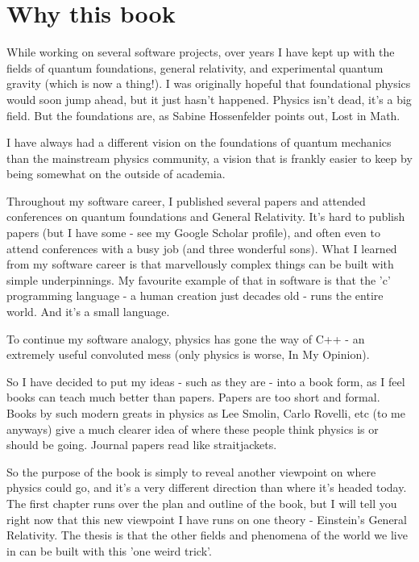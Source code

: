 \documentclass[../rzero]{subfiles}
\begin{document}
\section*{Why this book}
While working on several software projects, over years I have kept up with the fields of quantum foundations, general relativity, and experimental quantum gravity (which is now a thing!)\cite{Marletto2017}. I was originally hopeful that foundational physics would soon jump ahead, but it just hasn't happened. Physics isn't dead, it's a big field. But the foundations are, as Sabine Hossenfelder points out, Lost in Math\cite{hossenfelder2018lost}.

I have always had a different vision on the foundations of quantum mechanics than the mainstream physics community, a vision that is frankly easier to keep by being somewhat on the outside of academia.  

Throughout my software career, I published several papers and attended conferences on quantum foundations and General Relativity. It's hard to publish papers (but I have some - see my Google Scholar profile), and often even to attend conferences with a busy job (and three wonderful sons). What I learned from my software career is that marvellously complex things can be built with simple underpinnings. My favourite example of that in software is that the 'c' programming language - a human creation just decades old - runs the entire world. And it's a small language\cite{kernighan2002c}. 

To continue my software analogy, physics has gone the way of C++ - an extremely useful convoluted mess (only physics is worse, In My Opinion).   

So I have decided to put my ideas - such as they are - into a book form, as I feel books can teach much better than papers. Papers are too short and formal. Books by such modern greats in physics as Lee Smolin, Carlo Rovelli, etc (to me anyways) give a much clearer idea of where these people think physics is or should be going. Journal papers read like straitjackets. 

So the purpose of the book is simply to reveal another viewpoint on where physics could go, and it's a very different direction than where it's headed today. The first chapter runs over the plan and outline of the book, but I will tell you right now that this new viewpoint I have runs on one theory - Einstein's General Relativity. The thesis is that the other fields and phenomena of the world we live in can be built with this 'one weird trick'. 
\end{document}
